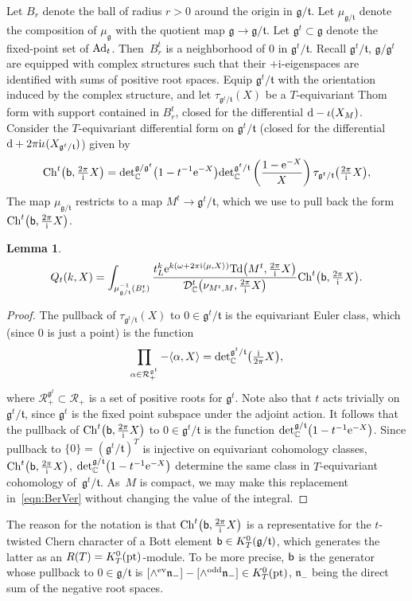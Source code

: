 \documentclass[11pt]{article}
\numberwithin{equation}{section}
\newtheorem{Lemma}[Theorem]{Lemma}
\newcommand{\pair}[2]{\langle #1, #2 \rangle}
\newcommand{\tn}[1]{\textnormal{#1}}
\renewcommand{\i}{{\mathrm{i}}}
\def\Ad{\ensuremath{\textnormal{Ad}}}
\def\g{\ensuremath{\mathfrak{g}}}
\def\t{\ensuremath{\mathfrak{t}}}
\def\n{\ensuremath{\mathfrak{n}}}
\def\R{\ensuremath{\mathcal{R}}}
\def\bC{\ensuremath{\mathbb{C}}}
\def\pt{\ensuremath{\textnormal{pt}}}
\def\Ch{\ensuremath{\textnormal{Ch}}}
\def\Td{\ensuremath{\textnormal{Td}}}
\def\calDC{\ensuremath{\mathcal{D}_{\bC}}}
\def\de{\ensuremath{\tn{det}_\bC}}
\begin{document}
Let $B_r$ denote the ball of radius $r>0$ around the origin in $\g/\t$. Let $\mu_{\g/\t}$ denote the composition of $\mu_\g$ with the quotient map $\g \rightarrow \g/\t$. Let $\g^t \subset \g$ denote the fixed-point set of $\Ad_t$. Then~$B_r^t$ is a neighborhood of $0$ in $\g^t/\t$. Recall $\g^t/\t$, $\g/\g^t$ are equipped with complex structures such that their $+\i$-eigenspaces are identified with sums of positive root spaces. Equip $\g^t/\t$ with the orientation induced by the complex structure, and let $\tau_{\g^t/\t}(X)$ be a $T$-equivariant Thom form with support contained in $B_r^t$, closed for the differential ${\rm d}-\iota(X_M)$. Consider the $T$-equivariant differential form on $\g^t/\t$ (closed for the differential ${\rm d}+2\pi \i \iota(X_{\g^t/\t})$) given by
\[ \Ch^t\big({\sf b},\tfrac{2\pi}{\i}X\big)=\de^{\g/\g^t}\big(1-t^{-1}{\rm e}^{-X}\big)\de^{\g^t/\t}\left(\frac{1-{\rm e}^{-X}}{X}\right)\tau_{\g^t/\t}\big(\tfrac{2\pi}{\i}X\big),\]
The map $\mu_{\g/\t}$ restricts to a map $M^t \rightarrow \g^t/\t$, which we use to pull back the form $\Ch^t\big({\sf b},\tfrac{2\pi}{\i}X\big)$.
\begin{Lemma}
\begin{gather}\label{eqn:Qg}
Q_t(k,X)=\int_{\mu_{\g/\t}^{-1}(B_r^t)} \frac{t_L^k {\rm e}^{k(\omega+2\pi \i\pair{\mu}{X})}\Td\big(M^t,\tfrac{2\pi}{\i}X\big)}{\calDC^t\big(\nu_{M^t,M},\tfrac{2\pi}{\i}X\big)}\Ch^t\big({\sf b},\tfrac{2\pi}{\i}X\big).
\end{gather}
\end{Lemma}
\begin{proof}The pullback of $\tau_{\g^t/\t}(X)$ to $0 \in \g^t/\t$ is the equivariant Euler class, which (since $0$ is just a point) is the function
\[ \prod_{\alpha \in \R^{\g^t}_+} -\pair{\alpha}{X}=\de^{\g^t/\t}\big(\tfrac{\i}{2\pi}X\big),\]
where $\R^{\g^t}_+\subset \R_+$ is a set of positive roots for $\g^t$. Note also that $t$ acts trivially on $\g^t/\t$, since $\g^t$ is the fixed point subspace under the adjoint action. It follows that the pullback of $\Ch^t\big({\sf b},\tfrac{2\pi}{\i}X\big)$ to $0 \in \g^t/\t$ is the function $\de^{\g/\t}\big(1-t^{-1}{\rm e}^{-X}\big)$. Since pullback to $\{0\}=(\g^t/\t)^T$ is injective on equivariant cohomology classes, $\Ch^t\big({\sf b},\tfrac{2\pi}{\i}X\big)$, $\de^{\g/\t}\big(1-t^{-1}{\rm e}^{-X}\big)$ determine the same class in $T$-equivariant cohomology of~$\g^t/\t$. As~$M$ is compact, we may make this replacement in~\eqref{eqn:BerVer} without changing the value of the integral.
\end{proof}
\begin{Remark}
The reason for the notation is that $\Ch^t\big({\sf b},\tfrac{2\pi}{\i}X\big)$ is a representative for the $t$-twisted Chern character of a Bott element ${\sf b} \in K_T^0(\g/\t)$, which generates the latter as an $R(T)=K_T^0(\pt)$-module. To be more precise, ${\sf b}$ is the generator whose pullback to $0 \in \g/\t$ is $[\wedge^{\tn{ev}} \n_-]-[\wedge^{\tn{odd}}\n_-] \in K^0_T(\pt)$, $\n_-$ being the direct sum of the negative root spaces.
\end{Remark}
\end{document}
